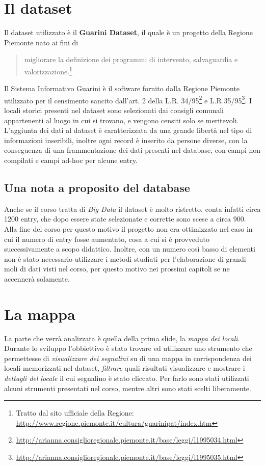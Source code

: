 	\section{Il dataset}
	Il dataset utilizzato è il \textbf{Guarini Dataset}, il quale è un progetto della Regione Piemonte nato ai fini di \begin{quote}%
	migliorare la definizione dei programmi di intervento, salvaguardia e valorizzazione.\footnote{Tratto dal sito ufficiale della Regione: \url{http://www.regione.piemonte.it/cultura/guarinipat/index.htm}}
	\end{quote}%
	Il Sistema Informativo Guarini è il software fornito dalla Regione Piemonte utilizzato per il censimento sancito dall'art. 2 della L.R. 34/95\footnote{\url{http://arianna.consiglioregionale.piemonte.it/base/leggi/l1995034.html}} e L.R 35/95\footnote{\url{http://arianna.consiglioregionale.piemonte.it/base/leggi/l1995035.html}}. I locali storici presenti nel dataset sono selezionati dai consigli comunali appartenenti al luogo in cui si trovano, e vengono censiti solo se meritevoli. L'aggiunta dei dati al dataset è caratterizzata da una grande libertà nel tipo di informazioni inseribili, inoltre ogni record è inserito da persone diverse, con la conseguenza di una frammentazione dei dati presenti nel database, con campi non compilati e campi ad-hoc per alcune entry.
	\subsection*{Una nota a proposito del database}
	Anche se il corso tratta di \emph{Big Data} il dataset è molto ristretto, conta infatti circa 1200 entry, che dopo essere state selezionate e corrette sono scese a circa 900. Alla fine del corso per questo motivo il progetto non era ottimizzato nel caso in cui il numero di entry fosse aumentato, cosa a cui si è provveduto successivamente a scopo didattico. Inoltre, con un numero così basso di elementi non è stato necessario utilizzare i metodi studiati per l'elaborazione di grandi moli di dati visti nel corso, per questo motivo nei prossimi capitoli se ne accennerà solamente.
	
	
	\section{La mappa}
	La parte che verrà analizzata è quella della prima slide, la \emph{mappa dei locali}. Durante lo sviluppo l'obbiettivo è stato trovare ed utilizzare uno strumento che permettesse di \emph{visualizzare dei segnalini} su di una mappa in corrispondenza dei locali memorizzati nel dataset, \emph{filtrare} quali risultati visualizzare e mostrare i \emph{dettagli del locale} il cui segnalino è stato cliccato.
	Per farlo sono stati utilizzati alcuni strumenti presentati nel corso, mentre altri sono stati scelti liberamente.
